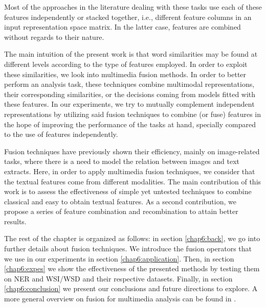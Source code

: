 

Most of the approaches in the literature dealing with these tasks use each of these features independently or stacked together, i.e., different feature columns in an input representation space matrix. In the latter case, features are combined without regards to their nature. 

The main intuition of the present work is that word similarities may be found at different levels according to the type of features employed. In order to exploit these similarities, we look into multimedia fusion methods.  In order to better perform an analysis task, these techniques combine multimodal representations, their corresponding similarities, or the decisions coming from models fitted with these features. In our experiments, we try to mutually complement independent representations by utilizing said fusion techniques to combine (or fuse) features in the hope of improving the performance of the tasks at hand, specially compared to the use of features independently. 

Fusion techniques have previously shown their efficiency, mainly on image-related tasks, where there is a need to model the relation  between images and text extracts.
%
%
Here, in order to apply multimedia fusion techniques, we consider that the textual features  come from different modalities. The main contribution of this work is to assess the effectiveness of simple yet untested techniques to combine classical and easy to obtain textual features. As a second contribution, we propose a series of feature combination and recombination to attain better results. 

The rest of the chapter is organized as follows: in section \ref{chap6:back}, we go into further details about fusion techniques. 
We introduce the fusion operators that we use in our experiments in section \ref{chap6:application}. Then, in section \ref{chap6:expes} we show the effectiveness of the presented methods by testing them on NER and WSI/WSD and their respective datasets. Finally, in section \ref{chap6:conclusion} we present our conclusions and future directions to explore. A more general overview on fusion for multimedia analysis can be found in \cite{AtreyHEK10}.

